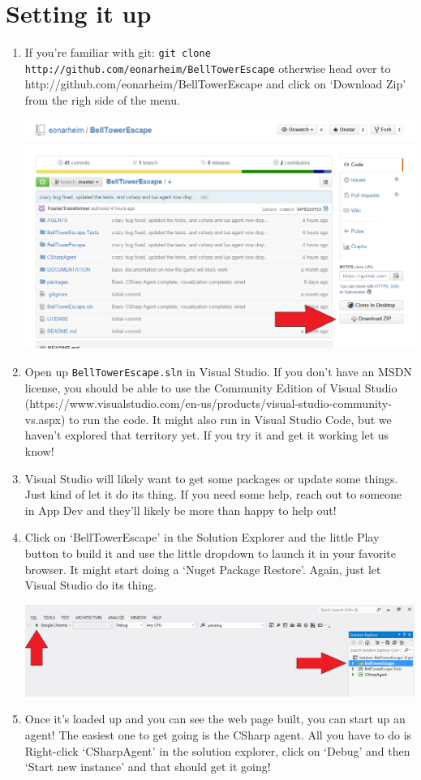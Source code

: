 \documentclass{article}
\begin{document}
\section*{Setting it up}
\begin{enumerate}
\item If you're familiar with git: \verb|git clone http://github.com/eonarheim/BellTowerEscape| otherwise head over to http://github.com/eonarheim/BellTowerEscape and click on `Download Zip' from the righ side of the menu.

\includegraphics[width=6.5in]{1-DownloadZip.png}

\item Open up \verb|BellTowerEscape.sln| in Visual Studio. If you don't have an MSDN license, you should be able to use the Community Edition of Visual Studio (https://www.visualstudio.com/en-us/products/visual-studio-community-vs.aspx) to run the code. It might also run in Visual Studio Code, but we haven't explored that territory yet. If you try it and get it working let us know!

\item Visual Studio will likely want to get some packages or update some things. Just kind of let it do its thing. If you need some help, reach out to someone in App Dev and they'll likely be more than happy to help out!

\item Click on `BellTowerEscape' in the Solution Explorer and the little Play button to build it and use the little dropdown to launch it in your favorite browser. It might start doing a `Nuget Package Restore'. Again, just let Visual Studio do its thing.

\includegraphics[width=6.5in]{4-BuildIt.png}
\newpage
\item Once it's loaded up and you can see the web page built, you can start up an agent! The easiest one to get going is the CSharp agent. All you have to do is Right-click `CSharpAgent' in the solution explorer, click on `Debug' and then `Start new instance' and that should get it going!


\end{enumerate}
\end{document}
